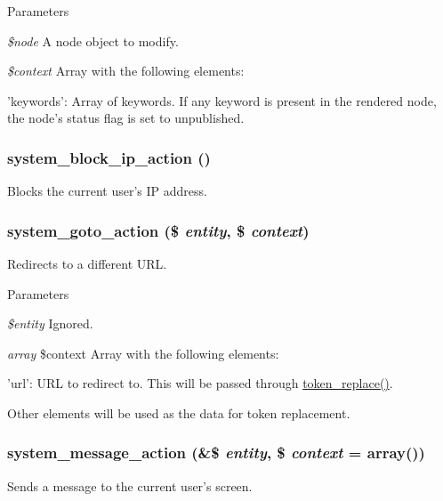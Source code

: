 \begin{DoxyParams}{Parameters}
\item[{\em \$node}]A node object to modify. \item[{\em \$context}]Array with the following elements:
\begin{DoxyItemize}
\item 'keywords': Array of keywords. If any keyword is present in the rendered node, the node's status flag is set to unpublished. 
\end{DoxyItemize}\end{DoxyParams}
\hypertarget{group__actions_ga02b4d9ad9eadcc1b795e2f145cc06db9}{
\subsubsection[{system\_\-block\_\-ip\_\-action}]{\setlength{\rightskip}{0pt plus 5cm}system\_\-block\_\-ip\_\-action ()}}
\label{group__actions_ga02b4d9ad9eadcc1b795e2f145cc06db9}
Blocks the current user's IP address. \hypertarget{group__actions_gae5230dbace638d69f196392fbc77e1af}{
\subsubsection[{system\_\-goto\_\-action}]{\setlength{\rightskip}{0pt plus 5cm}system\_\-goto\_\-action (\$ {\em entity}, \/  \$ {\em context})}}
\label{group__actions_gae5230dbace638d69f196392fbc77e1af}
Redirects to a different URL.


\begin{DoxyParams}{Parameters}
\item[{\em \$entity}]Ignored. \item[{\em array}]\$context Array with the following elements:
\begin{DoxyItemize}
\item 'url': URL to redirect to. This will be passed through \hyperlink{includes_2token_8inc_a47eb294b05ca8d04439a9a82ccc4d82a}{token\_\-replace()}.
\item Other elements will be used as the data for token replacement. 
\end{DoxyItemize}\end{DoxyParams}
\hypertarget{group__actions_ga5dd09e03b155bd9ad1ef0dad464661e3}{
\subsubsection[{system\_\-message\_\-action}]{\setlength{\rightskip}{0pt plus 5cm}system\_\-message\_\-action (\&\$ {\em entity}, \/  \$ {\em context} = {\ttfamily array()})}}
\label{group__actions_ga5dd09e03b155bd9ad1ef0dad464661e3}
Sends a message to the current user's screen.


